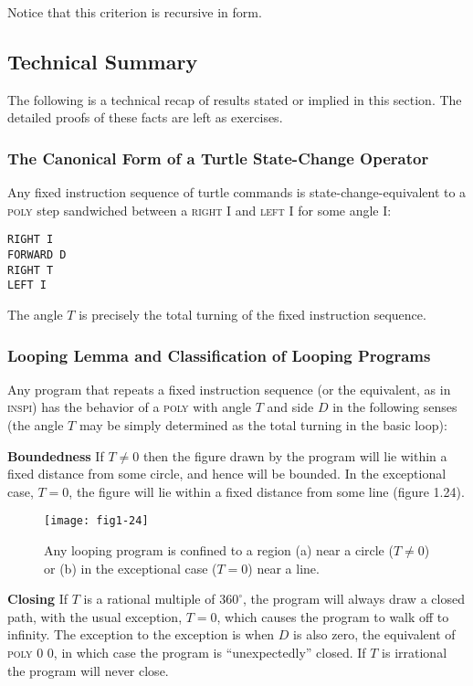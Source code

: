 \documentclass{book}
\begin{document}
Notice that this criterion is recursive in form.

\subsection{Technical Summary}

The following is a technical recap of results stated or implied in this
section. The detailed proofs of these facts are left as exercises.

\subsubsection{The Canonical Form of a Turtle State-Change Operator}

Any fixed instruction sequence of turtle commands is state-change-equivalent to a \textsc{poly} step sandwiched between a \textsc{right} I  and \textsc{left} I  for some angle I:

\begin{verbatim}
RIGHT I
FORWARD D
RIGHT T
LEFT I
\end{verbatim}
The angle $T$ is precisely the total turning of the fixed instruction sequence.

\subsubsection{Looping Lemma and Classification of Looping Programs}

Any program that repeats a fixed instruction sequence (or the equivalent,
as in \textsc{inspi}) has the behavior of a \textsc{poly} with angle $T$ and side $D$ in the
following senses (the angle $T$ may be simply determined as the total
turning in the basic loop):

\noindent \textbf{Boundedness} If $T \not= 0$ then the figure drawn by the program will lie
within a fixed distance from some circle, and hence will be bounded. In
the exceptional case, $T = 0$, the figure will lie within a fixed distance
from some line (figure 1.24).

\begin{figure}
\begin{center}
\texttt{[image: fig1-24]}
\caption{Any looping program is confined to a region (a) near a circle ($T \not= 0$) or (b) in the exceptional case ($T = 0$) near a line.}
\end{center}
\end{figure}

\noindent \textbf{Closing} If $T$ is a rational multiple of $360^{\circ}$, the program will always
draw a closed path, with the usual exception, $T = 0$, which causes the
program to walk off to infinity. The exception to the exception is when
$D$ is also zero, the equivalent of \textsc{poly 0 0}, in which case the program is
``unexpectedly'' closed. If $T$ is irrational the program will never close.
\end{document}
